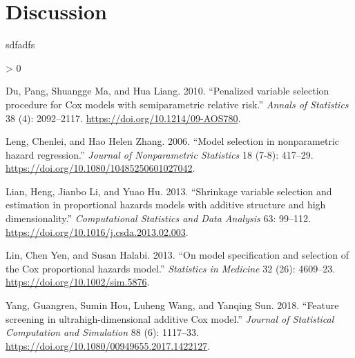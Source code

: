 \documentclass{article}
\newlength{\cslhangindent}
\newenvironment{CSLReferences}[2] %
 {%
  \setlength{\parindent}{0pt}
  \ifodd #1 \everypar{\setlength{\hangindent}{\cslhangindent}}\ignorespaces\fi
  \ifnum #2 > 0
  \setlength{\parskip}{#2\baselineskip}
  \fi
 }%
 {}
\begin{document}
\newpage

\hypertarget{discussion}{%
\section{Discussion}\label{discussion}}

sdfadfs \newpage

\hypertarget{refs}{}
\begin{CSLReferences}{1}{0}
\leavevmode\hypertarget{ref-Du2010}{}%
Du, Pang, Shuangge Ma, and Hua Liang. 2010. {``{Penalized variable
selection procedure for Cox models with semiparametric relative
risk}.''} \emph{Annals of Statistics} 38 (4): 2092--2117.
\url{https://doi.org/10.1214/09-AOS780}.

\leavevmode\hypertarget{ref-Leng2006}{}%
Leng, Chenlei, and Hao Helen Zhang. 2006. {``{Model selection in
nonparametric hazard regression}.''} \emph{Journal of Nonparametric
Statistics} 18 (7-8): 417--29.
\url{https://doi.org/10.1080/10485250601027042}.

\leavevmode\hypertarget{ref-Lian2013}{}%
Lian, Heng, Jianbo Li, and Yuao Hu. 2013. {``{Shrinkage variable
selection and estimation in proportional hazards models with additive
structure and high dimensionality}.''} \emph{Computational Statistics
and Data Analysis} 63: 99--112.
\url{https://doi.org/10.1016/j.csda.2013.02.003}.

\leavevmode\hypertarget{ref-Lin2013}{}%
Lin, Chen Yen, and Susan Halabi. 2013. {``{On model specification and
selection of the Cox proportional hazards model}.''} \emph{Statistics in
Medicine} 32 (26): 4609--23. \url{https://doi.org/10.1002/sim.5876}.

\leavevmode\hypertarget{ref-Yang2018}{}%
Yang, Guangren, Sumin Hou, Luheng Wang, and Yanqing Sun. 2018.
{``{Feature screening in ultrahigh-dimensional additive Cox model}.''}
\emph{Journal of Statistical Computation and Simulation} 88 (6):
1117--33. \url{https://doi.org/10.1080/00949655.2017.1422127}.

\end{CSLReferences}



\end{document}
